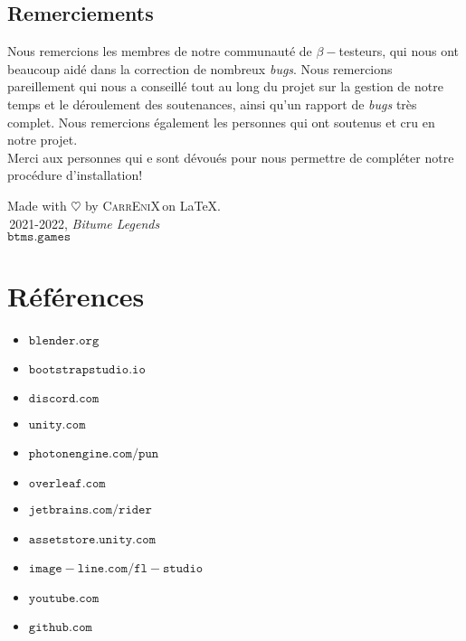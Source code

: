 \documentclass[a4paper,12pt]{article}
\newcommand{\btmlgs}{\textsl{Bitume Legends}}
\newcommand{\CEX}{\textsc{CarrEniX}}
\newcommand{\SITE}{\(\mathtt{btms.games}\)}
\begin{document}
    \subsection{Remerciements}
        Nous remercions les membres de notre communauté de \(\beta-\)testeurs, qui nous ont beaucoup aidé dans la
        correction de nombreux \textsl{bugs}. Nous remercions pareillement  qui nous a conseillé tout au long du projet sur la gestion de notre temps et le déroulement des soutenances, ainsi qu'un rapport de \textsl{bugs} très complet. Nous remercions également les personnes qui ont soutenus et cru en notre projet.\\
        Merci aux personnes qui e sont dévoués pour nous permettre de compléter notre procédure d'installation!
    
    
    \begin{center}
        Made with $\heartsuit$ by \CEX\,on \LaTeX.\\
        \textcopyright\,2021-2022, \btmlgs\\
        \SITE
    \end{center}

    
    
\section*{Références}
        \begin{itemize}
            \item \(\mathtt{blender.org}\)
            \item \(\mathtt{bootstrapstudio.io}\)
            \item \(\mathtt{discord.com}\)
            \item \(\mathtt{unity.com}\)
            \item \(\mathtt{photonengine.com/pun}\)
            \item \(\mathtt{overleaf.com}\)
            \item \(\mathtt{jetbrains.com/rider}\)
            \item \(\mathtt{assetstore.unity.com}\)
            \item \(\mathtt{image-line.com/fl-studio}\)
            \item \(\mathtt{youtube.com}\)
            \item \(\mathtt{github.com}\)
        \end{itemize}

    \clearpage
    \listoftables
    \listoffigures
\end{document}
